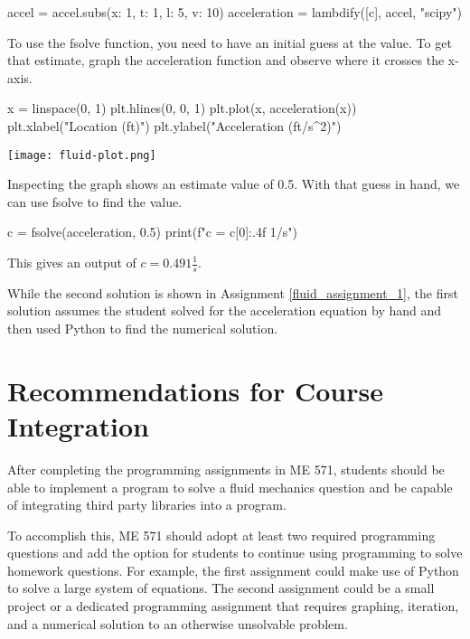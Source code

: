\begin{tcolorbox}[breakable, enhanced jigsaw, title=ME 571: Assignment \ref{fluid_assignment_1}, 
    colframe=ksu-purple, colback=ksu-gray]
\begin{python}
accel = accel.subs({x: 1, t: 1, l: 5, v: 10})
acceleration = lambdify([c], accel, "scipy")
\end{python}

To use the fsolve function, you need to have an initial guess at the value. To get that
estimate, graph the acceleration function and observe where it crosses the x-axis.

\begin{python}
x = linspace(0, 1)
plt.hlines(0, 0, 1)
plt.plot(x, acceleration(x))
plt.xlabel("Location (ft)")
plt.ylabel("Acceleration (ft/s^2)")
\end{python}

\begin{center}
    \texttt{[image: fluid-plot.png]}
\end{center}

Inspecting the graph shows an estimate value of 0.5. With that guess in hand, 
we can use fsolve to find the value.

\begin{python}
c = fsolve(acceleration, 0.5)
print(f"c = {c[0]:.4f} 1/s")
\end{python}

This gives an output of $ c = 0.491 \frac{1}{s} $.
\end{tcolorbox}

While the second solution is shown in Assignment \ref{fluid_assignment_1}, the first solution
assumes the student solved for the acceleration equation by hand and then used Python to
find the numerical solution.

\section{Recommendations for Course Integration}

After completing the programming assignments in ME 571, students should be able to implement a program to solve 
a fluid mechanics question and be capable of integrating third party libraries into a program. 

To accomplish this, ME 571 should adopt at least two required programming questions and add the option for 
students to continue using programming to solve homework questions. For example, the first assignment could
make use of Python to solve a large system of equations. The second assignment could be a small project or a dedicated
programming assignment that requires graphing, iteration, and a numerical solution to an otherwise unsolvable problem.


